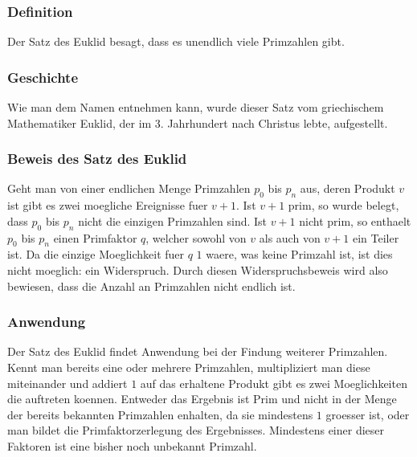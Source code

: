 \subsubsection{Definition}
Der Satz des Euklid besagt, dass es unendlich viele Primzahlen gibt.
\subsubsection{Geschichte}
Wie man dem Namen entnehmen kann, wurde dieser Satz vom griechischem Mathematiker Euklid, der im 3. Jahrhundert nach Christus lebte, aufgestellt.
\subsubsection{Beweis des Satz des Euklid}
Geht man von einer endlichen Menge Primzahlen $p_0$ bis $p_n$ aus, deren Produkt $v$ ist gibt es zwei moegliche Ereignisse fuer $v + 1$.
Ist $v + 1$ prim, so wurde belegt, dass  $p_0$ bis $p_n$ nicht die einzigen Primzahlen sind.
Ist $v + 1$ nicht prim, so enthaelt $p_0$ bis $p_n$ einen Primfaktor $q$, welcher sowohl von $v$ als auch von $v + 1$ ein Teiler ist. Da die einzige Moeglichkeit fuer $q$ $1$ waere, was keine Primzahl ist, ist dies nicht moeglich: ein Widerspruch.
Durch diesen Widerspruchsbeweis wird also bewiesen, dass die Anzahl an Primzahlen nicht endlich ist.
\subsubsection{Anwendung}
Der Satz des Euklid findet Anwendung bei der Findung weiterer Primzahlen. Kennt man bereits eine oder mehrere Primzahlen, multipliziert man diese miteinander und addiert $1$ auf das erhaltene Produkt gibt es zwei Moeglichkeiten die auftreten koennen. Entweder das Ergebnis ist Prim und nicht in der Menge der bereits bekannten  Primzahlen enhalten, da sie mindestens $1$ groesser ist, oder man bildet die Primfaktorzerlegung des Ergebnisses. Mindestens einer dieser Faktoren ist eine bisher noch unbekannt Primzahl.
